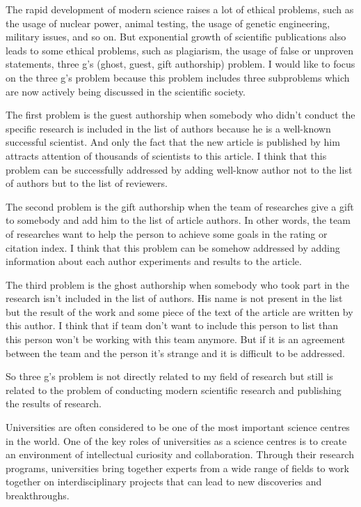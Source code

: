 \documentclass[main.tex]{subfiles}
\begin{document}
\setcounter{subsection}{3}

The rapid development of modern science raises a lot of ethical problems, such as the usage of nuclear power, animal testing, the usage of genetic engineering, military issues, and so on.
But exponential growth of scientific publications also leads to some ethical problems, such as plagiarism, the usage of false or unproven statements, three g's (ghost, guest, gift authorship) problem.
I would like to focus on the three g's problem because this problem includes three subproblems which are now actively being discussed in the scientific society.

The first problem is the guest authorship when somebody who didn't conduct the specific research is included in the list of authors because he is a well-known successful scientist.
And only the fact that the new article is published by him attracts attention of thousands of scientists to this article.
I think that this problem can be successfully addressed by adding well-know author not to the list of authors but to the list of reviewers.

The second problem is the gift authorship when the team of researches give a gift to somebody and add him to the list of article authors.
In other words, the team of researches want to help the person to achieve some goals in the rating or citation index. I think that this problem can be somehow addressed by adding information about each author experiments and results to the article.

The third problem is the ghost authorship when somebody who took part in the research isn't included in the list of authors. His name is not present in the list but the result of the work and some piece of the text of the article are written by this author.
I think that if team don't want to include this person to list than this person won't be working with this team anymore.
But if it is an agreement between the team and the person it's strange and it is difficult to be addressed.

So three g's problem is not directly related to my field of research but still is related to the problem of conducting modern scientific research and publishing the results of research.
\newpage


\setcounter{subsection}{4}

Universities are often considered to be one of the most important science centres in the world.
One of the key roles of universities as a science centres is to create an environment of intellectual curiosity and collaboration.
Through their research programs, universities bring together experts from a wide range of fields to work together on interdisciplinary projects that can lead to new discoveries and breakthroughs.
\end{document}
